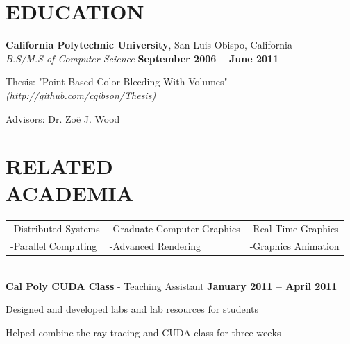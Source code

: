 \documentclass[margin,line]{resume}
\begin{document}
\begin{resume}
\sectionline

    \section{\mysidestyle \textbf{\large{E}\small{DUCATION}}}

    \textbf{\listing California Polytechnic University}, San Luis Obispo, California \vspace{2mm}\\\vspace{1mm}%
    \textsl{B.S/M.S of Computer Science} \hfill \textbf{ September 2006 -- June 2011}\vspace{-3mm}\\\vspace{-1mm}%
    \begin{list2}
        \item Thesis: "Point Based Color Bleeding With Volumes" \textsl{(http://github.com/cgibson/Thesis)}
        \item Advisors:  Dr. Zo\"{e} J. Wood
    \end{list2}\vspace{-1.5mm}


\sectionline

    \section{\mysidestyle \textbf{\large{R}\small{ELATED\\ACADEMIA}}} 

	\vspace{1mm} %
	\begin{tabular}{@{}p{5cm}p{5cm}p{5cm}}
	-Distributed Systems     &  -Graduate Computer Graphics &  -Real-Time Graphics\\
	-Parallel Computing      &  -Advanced Rendering         &  -Graphics Animation\\
	\end{tabular}
	\vspace{2mm} \\
	\textbf{\listing Cal Poly CUDA Class} - Teaching Assistant \hfill \textbf{ January 2011 -- April 2011}\vspace{-3mm}\\\vspace{-1mm}%
    \begin{list2}
    	\item Designed and developed labs and lab resources for students
        \item Helped combine the ray tracing and CUDA class for three weeks
    \end{list2}\vspace{-1.5mm}


\end{resume}
\end{document}
